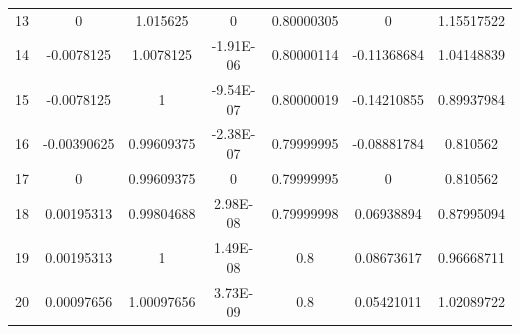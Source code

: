 \begin{table}[H]
\begin{tabular}{c|cccccc|}
    \multicolumn{1}{|c|}{13} & 0                                          & 1.015625                             & 0                                               & 0.80000305                               & 0                                                          & 1.15517522                      \\ \cline{1-1}
    \multicolumn{1}{|c|}{14} & -0.0078125                                 & 1.0078125                            & -1.91E-06                                       & 0.80000114                               & -0.11368684                                                & 1.04148839                      \\ \cline{1-1}
    \multicolumn{1}{|c|}{15} & -0.0078125                                 & 1                                    & -9.54E-07                                       & 0.80000019                               & -0.14210855                                                & 0.89937984                      \\ \cline{1-1}
    \multicolumn{1}{|l|}{16} & -0.00390625                                & 0.99609375                           & -2.38E-07                                       & 0.79999995                               & -0.08881784                                                & 0.810562                        \\ \cline{1-1}
    \multicolumn{1}{|l|}{17} & 0                                          & 0.99609375                           & 0                                               & 0.79999995                               & 0                                                          & 0.810562                        \\ \cline{1-1}
    \multicolumn{1}{|l|}{18} & 0.00195313                                 & 0.99804688                           & 2.98E-08                                        & 0.79999998                               & 0.06938894                                                 & 0.87995094                      \\ \cline{1-1}
    \multicolumn{1}{|l|}{19} & 0.00195313                                 & 1                                    & 1.49E-08                                        & 0.8                                      & 0.08673617                                                 & 0.96668711                      \\ \cline{1-1}
    \multicolumn{1}{|l|}{20} & 0.00097656                                 & 1.00097656                           & 3.73E-09                                        & 0.8                                      & 0.05421011                                                 & 1.02089722                      \\ \cline{1-1}

\end{tabular}
\end{table}
